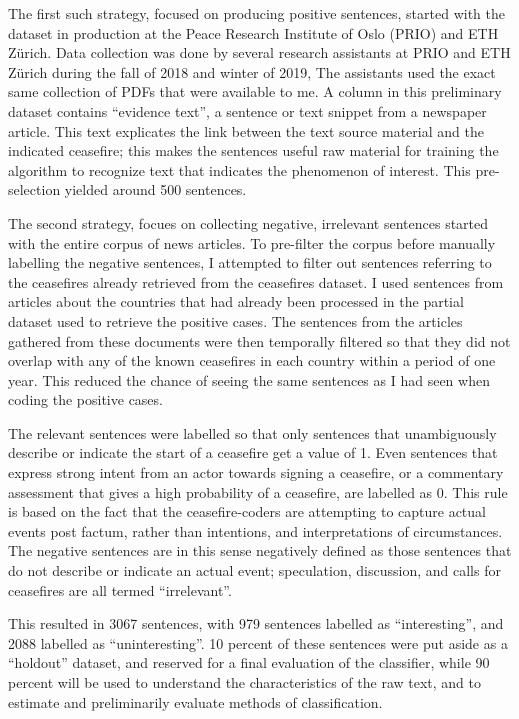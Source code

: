 \documentclass[12pt,twoside]{reedthesis}
\begin{document}
The first such strategy, focused on producing positive sentences,
started with the dataset in production at the Peace Research Institute
of Oslo (PRIO) and ETH Zürich. Data collection was done by several
research assistants at PRIO and ETH Zürich during the fall of 2018 and
winter of 2019, The assistants used the exact same collection of PDFs
that were available to me. A column in this preliminary dataset contains
``evidence text'', a sentence or text snippet from a newspaper article.
This text explicates the link between the text source material and the
indicated ceasefire; this makes the sentences useful raw material for
training the algorithm to recognize text that indicates the phenomenon
of interest. This pre-selection yielded around 500 sentences.

The second strategy, focues on collecting negative, irrelevant sentences
started with the entire corpus of news articles. To pre-filter the
corpus before manually labelling the negative sentences, I attempted to
filter out sentences referring to the ceasefires already retrieved from
the ceasefires dataset. I used sentences from articles about the
countries that had already been processed in the partial dataset used to
retrieve the positive cases. The sentences from the articles gathered
from these documents were then temporally filtered so that they did not
overlap with any of the known ceasefires in each country within a period
of one year. This reduced the chance of seeing the same sentences as I
had seen when coding the positive cases.

The relevant sentences were labelled so that only sentences that
unambiguously describe or indicate the start of a ceasefire get a value
of 1. Even sentences that express strong intent from an actor towards
signing a ceasefire, or a commentary assessment that gives a high
probability of a ceasefire, are labelled as 0. This rule is based on the
fact that the ceasefire-coders are attempting to capture actual events
post factum, rather than intentions, and interpretations of
circumstances. The negative sentences are in this sense negatively
defined as those sentences that do not describe or indicate an actual
event; speculation, discussion, and calls for ceasefires are all termed
``irrelevant''.

This resulted in 3067 sentences, with 979 sentences labelled as
``interesting'', and 2088 labelled as ``uninteresting''. 10 percent of
these sentences were put aside as a ``holdout'' dataset, and reserved
for a final evaluation of the classifier, while 90 percent will be used
to understand the characteristics of the raw text, and to estimate and
preliminarily evaluate methods of classification.
\end{document}
